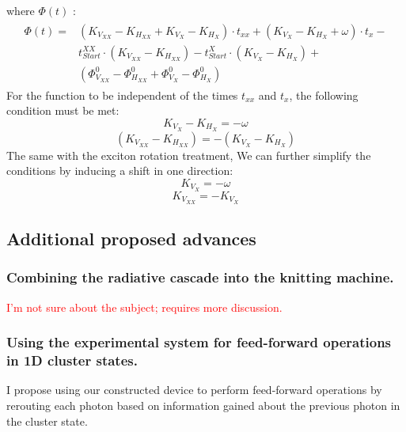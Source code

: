 where $\Phi(t)$ :
\begin{equation}
\begin{split}  
\begin{aligned} 
	\Phi(t) = &(K_{V_{XX}}-K_{H_{XX}}+K_{V_X} - K_{H_X})\cdot t_{xx}+(K_{V_X}-K_{H_X} + \omega)\cdot t_x -\\
 &t^{XX}_{Start} \cdot(K_{V_{XX}} - K_{H_{XX}})-t^X_{Start} \cdot(K_{V_X}-K_{H_X})+\\
 &(\Phi^0_{V_{XX}}-\Phi^0_{H_{XX}}+\Phi^0_{V_{X}}-\Phi^0_{H_{X}})
 \end{aligned}
 \end{split}
\end{equation}
For the function to be independent of the times $t_{xx}$ and $t_{x}$, the following condition must be met:
\begin{equation}
	K_{V_X}-K_{H_X} = -\omega
\end{equation}
\begin{equation}
	(K_{V_{XX}} -K_{H_{XX}}) = -(K_{V_X}-K_{H_X})
\end{equation}
The same with the exciton rotation treatment, We can further simplify the conditions by inducing a shift in one direction:
\begin{equation}
	K_{V_X} = -\omega
\end{equation}
\begin{equation}
	K_{V_{XX}} = -K_{V_X}
\end{equation}
\subsection{Additional proposed advances}
\subsubsection{Combining the radiative cascade into the knitting machine.}
\textcolor{red} {I'm not sure about the subject; requires more discussion. }
\subsubsection{Using the experimental system for feed-forward operations in 1D cluster states.}
I propose using our constructed device to perform feed-forward operations by rerouting each photon based on information gained about the previous photon in the cluster state. 